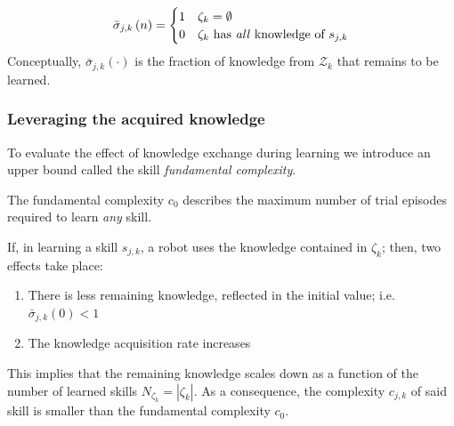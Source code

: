 \begin{equation}\label{eq:sigma_bar_conditions}
	\bar{\sigma}_{j,k}\left(n\right) = 
	\begin{cases}
		1 & \text{$\mathcal{\zeta}_k=\emptyset$}\\
		0 &\text{$\mathcal{\zeta}_k$ has \emph{all} knowledge of $s_{j,k}$}
	\end{cases}
\end{equation}
Conceptually, $\bar{\sigma}_ {j,k}\left(\cdot\right)$ is the fraction of knowledge from ${\mathcal{Z}_k}$ that remains to be learned.

\subsubsection{\textbf{Leveraging the acquired knowledge}}
To evaluate the effect of knowledge exchange during learning we introduce an upper bound called the skill \textit{fundamental complexity}.
\begin{tcolorbox}
	\begin{definition}\label{assumption:fundamental_complexity}
		The fundamental complexity $c_0$ describes the maximum number of trial episodes required to learn \emph{any} skill.
	\end{definition}
\end{tcolorbox}
If, in learning a skill $ s_{j,k} $, a robot uses the knowledge contained in $\mathcal{\zeta}_k$; then, two effects take place:
\begin{enumerate}
	\item There is less remaining knowledge, reflected in the initial value; i.e. $\bar{\sigma}_{j,k}(0) < 1$
	\item The knowledge acquisition rate increases
\end{enumerate}
This implies that the remaining knowledge scales down as a function of the number of learned skills $N_{\zeta_k}=|\mathcal{\zeta}_k|$. As a consequence, the complexity $c_{j,k}$ of said skill is smaller than the fundamental complexity $c_0$.%

